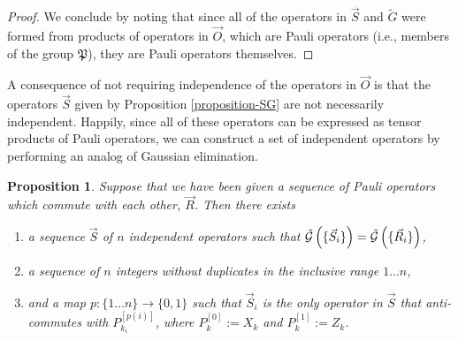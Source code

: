 \documentclass[twocolumn,showpacs,preprintnumbers,amsmath,amssymb,nofootinbib,pra,floatfix]{revtex4-1}
\newtheorem{proposition}{Proposition}
\newenvironment{remark}[1][Remark]{\begin{trivlist}
\item[\hskip \labelsep {\bfseries #1}]}{\end{trivlist}}
\newcommand{\lst}{\vec}
\newcommand{\set}{\tilde}
\newcommand{\genfun}{\tilde{\mathcal{G}}}
\newcommand{\pauligroup}{\mathfrak{P}}
\begin{document}
\begin{proof}
We conclude by noting that since all of the operators in $\lst S$ and $\set G$ were formed from products of operators in $\lst O$, which are Pauli operators (i.e., members of the group $\pauligroup$), they are Pauli operators themselves.
\end{proof}
\begin{remark}
A consequence of not requiring independence of the operators in $\lst O$ is that the operators $\lst S$ given by Proposition \ref{proposition-SG} are not necessarily independent.  Happily, since all of these operators can be expressed as tensor products of Pauli operators, we can construct a set of independent operators by performing an analog of Gaussian elimination.
\end{remark}

\begin{proposition}
\label{make-independent-using-elimination}
Suppose that we have been given a sequence of Pauli operators which commute with each other, $\lst R$.  Then there exists
\begin{enumerate}
\item a sequence $\lst S$ of $n$ independent operators such that $\genfun\paren{\{\lst S_i\}}=\genfun\paren{\{\lst R_i\}}$,
\item a sequence of $n$ integers without duplicates in the inclusive range $1\dots n$,
\item and a map $p:\{1\dots n\} \to \{0,1\}$ such that $\lst S_i$ is the only operator in $\lst S$ that anti-commutes with $P_{k_i}^{[p(i)]}$, where $P_k^{[0]}:=X_k$ and $P_k^{[1]}:=Z_k$.
\end{enumerate}
\end{proposition}
\end{document}
